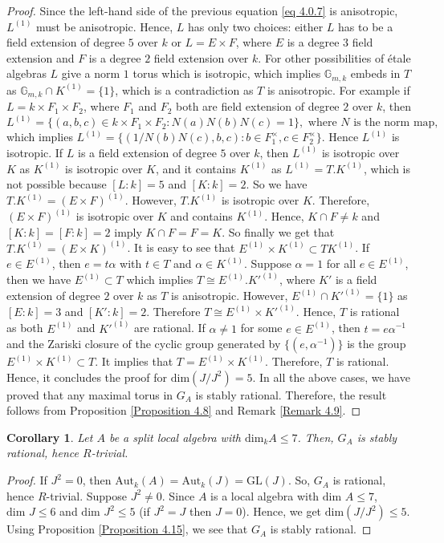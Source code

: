 \documentclass[12pt]{amsart}
\newtheorem{corollary}[theorem]{Corollary}
\theoremstyle{definition}
\numberwithin{equation}{section}
\begin{document}
\begin{proof}
Since the left-hand side of the previous equation \ref{eq 4.0.7} is anisotropic, $L^{(1)}$ must be anisotropic. Hence, $L$ has only two choices: either $L$ has to be a field extension of degree $5$ over $k$ or $L=E\times F$, where $E$ is a degree $3$ field extension and $F$ is a degree $2$ field extension over $k$. For other possibilities of \'etale algebras $L$ give a norm $1$ torus which is isotropic, which implies $\mathbb{G}_{m,k}$ embeds in $T$ as $\mathbb{G}_{m,k}\cap K^{(1)}=\{1\}$, which is a contradiction as $T$ is anisotropic. For example if $L=k\times F_1\times F_2$, where $F_1$ and $F_2$ both are field extension of degree $2$ over $k$, then \[L^{(1)}=\{(a,b,c)\in k\times F_1\times F_2:N(a)N(b)N(c)=1\}, \text{ where $N$ is the norm map, }\] which implies $L^{(1)}=\{(1/N(b)N(c),b,c):b\in F_{1}^{\times}, c\in F_{2}^{\times}\}$. Hence $L^{(1)}$ is isotropic. If $L$ is a field extension of degree $5$ over $k$, then $L^{(1)}$ is isotropic over $K$ as $K^{(1)}$ is isotropic over $K$, and it contains $K^{(1)}$ as $L^{(1)}=T.K^{(1)}$, which is not possible because $[L:k]=5$ and $[K:k]=2$. So we have $T.K^{(1)}=(E\times F)^{(1)}$. However, $T.K^{(1)}$ is isotropic over $K$. Therefore, $(E\times F)^{(1)}$ is isotropic over $K$ and contains $K^{(1)}$. Hence, $K\cap F\neq k$ and $[K:k]=[F:k]=2$ imply $K\cap F=F=K$. So finally we get that $T.K^{(1)}=(E\times K)^{(1)}$. It is easy to see that $E^{(1)}\times K^{(1)}\subset TK^{(1)}$. If $e\in E^{(1)}$, then $e=t\alpha$ with $t\in T$ and $\alpha\in K^{(1)}$. Suppose $\alpha =1$ for all $e\in E^{(1)}$, then we have $E^{(1)}\subset T$ which implies $T\cong E^{(1)}.K'^{(1)}$, where $K'$ is a field extension of degree $2$ over $k$ as $T$ is anisotropic. However, $E^{(1)}\cap K'^{(1)}=\{1\}$ as $[E:k]=3$ and $[K':k]=2$. Therefore $T\cong E^{(1)}\times K'^{(1)}$. Hence, $T$ is rational as both $E^{(1)}$ and $K'^{(1)}$ are rational. If $\alpha\neq 1$ for some $e\in E^{(1)}$, then $t=e\alpha^{-1}$ and the Zariski closure of the cyclic group generated by ${\{(e,\alpha^{-1})\}}$ is the group $E^{(1)}\times K^{(1)}\subset T$. It implies that $T=E^{(1)}\times K^{(1)}$. Therefore, $T$ is rational. Hence, it concludes the proof for $\text{dim}(J/J^2)=5$. In all the above cases, we have proved that any maximal torus in $G_A$ is stably rational. Therefore, the result follows from Proposition \ref{Proposition 4.8} and Remark \ref{Remark 4.9}.
\end{proof}


\vskip2mm

\begin{corollary}\label{Corollary 4.16}
Let $A$ be a split local algebra with $\mathrm{dim}_k A\leq 7$. Then, $G_A$ is stably rational, hence $R$-trivial.
\end{corollary}
\vskip1mm
 \begin{proof}
 If $J^2=0$, then $\text{Aut}_k(A)=\text{Aut}_k(J)=\text{GL}(J)$. So, $G_A$ is rational, hence $R$-trivial. Suppose $J^2\neq0$. Since $A$ is a local algebra with $\text{dim }A\leq 7$, $\text{dim }J\leq 6$ and $\text{dim }J^2\leq 5$ (if $J^2=J$ then $J=0$). Hence, we get $\text{dim}(J/J^2)\leq 5$. Using Proposition \ref{Proposition 4.15}, we see that $G_A$ is stably rational.
\end{proof}
\end{document}
